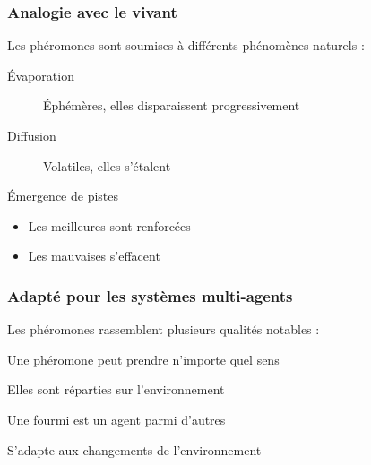 \documentclass{beamer}
\begin{document}
\begin{frame}

  \frametitle{Analogie avec le vivant}

  Les phéromones sont soumises à différents phénomènes naturels :
  \begin{description}
    \item[\'Evaporation]{\'Ephémères, elles disparaissent progressivement}
    \item[Diffusion]{Volatiles, elles s'étalent}
  \end{description}

  \vfill

  \begin{block}{\'Emergence de pistes}
    \begin{itemize}
    \item{Les meilleures sont renforcées}
    \item{Les mauvaises s'effacent}
    \end{itemize}
  \end{block}

\end{frame}

\begin{frame}

  \frametitle{Adapté pour les systèmes multi-agents}

  Les phéromones rassemblent plusieurs qualités notables :

  \vfill

  \begin{block}{}
    \begin{description}[Décentralisation]
    \item[Diversité]{Une phéromone peut prendre n'importe quel sens}
    \item[Distribution]{Elles sont réparties sur l'environnement}
    \item[Décentralisation]{Une fourmi est un agent parmi d'autres}
    \item[Dynamicité]{S'adapte aux changements de l'environnement}
    \end{description}
  \end{block}

\end{frame}
\end{document}

